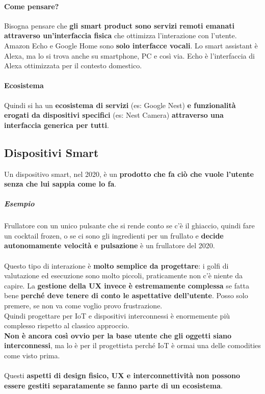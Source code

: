 \documentclass[10pt]{article}
\begin{document}
\paragraph{Come pensare?} Bisogna pensare che \textbf{gli smart product sono servizi remoti emanati attraverso un'interfaccia fisica} che ottimizza l'interazione con l'utente.\\
Amazon Echo e Google Home sono \textbf{solo interfacce vocali}. Lo smart assistant è Alexa, ma lo si trova anche su smartphone, PC e così via. Echo è l'interfaccia di Alexa ottimizzata per il contesto domestico.
\paragraph{Ecosistema} Quindi si ha un \textbf{ecosistema di servizi} (es: Google Nest) \textbf{e funzionalità erogati da dispositivi specifici} (es: Nest Camera) \textbf{attraverso una interfaccia generica per tutti}.
\subsection{Dispositivi Smart}
Un dispositivo smart, nel 2020, è un \textbf{prodotto che fa ciò che vuole l'utente senza che lui sappia come lo fa}.
\subparagraph{Esempio} Frullatore con un unico pulsante che si rende conto se c'è il ghiaccio, quindi fare un cocktail frozen, o se ci sono gli ingredienti per un frullato e \textbf{decide autonomamente velocità e pulsazione} è un frullatore del 2020.\\\\
Questo tipo di interazione è \textbf{molto semplice da progettare}: i golfi di valutazione ed esecuzione sono molto piccoli, praticamente non c'è niente da capire. La \textbf{gestione della UX invece è estremamente complessa} se fatta bene \textbf{perché deve tenere di conto le aspettative dell'utente}. Posso solo premere, se non va come voglio provo frustrazione.\\
Quindi progettare per IoT e dispositivi interconnessi è enormemente più complesso rispetto al classico approccio.\\
\textbf{Non è ancora così ovvio per la base utente che gli oggetti siano interconnessi}, ma lo è per il progettista perché IoT è ormai una delle comodities come visto prima.\\\\
Questi \textbf{aspetti di design fisico, UX e interconnettività non possono essere gestiti separatamente se fanno parte di un ecosistema}.
\end{document}
